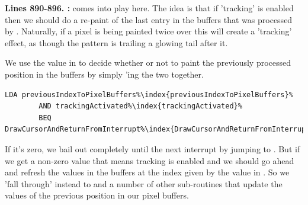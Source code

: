 \textbf{Lines 890-896. :} 
 comes into play here. The idea is that if 'tracking'
is enabled then we should do a re-paint of the last entry in the buffers that was
processed by . Naturally, if a pixel is being painted twice
over this will create a 'tracking' effect, as though the pattern is trailing a 
glowing tail after it.

We use the value in  to decide whether or not to paint
the previously processed position in the buffers by simply 'ing the
two together.

\begin{lstlisting}[escapechar=\%]
        LDA previousIndexToPixelBuffers%\index{previousIndexToPixelBuffers}%
        AND trackingActivated%\index{trackingActivated}%
        BEQ DrawCursorAndReturnFromInterrupt%\index{DrawCursorAndReturnFromInterrupt}%
\end{lstlisting}

If it's zero, we bail out
completely until the next interrupt by jumping to .
But if we get a non-zero value that means tracking is enabled and 
we should go ahead and refresh the values in the buffers at the index given
by the value in . So we 'fall through' instead to
 and a number of other sub-routines that update the
values of the previous position in our pixel buffers.

\clearpage
